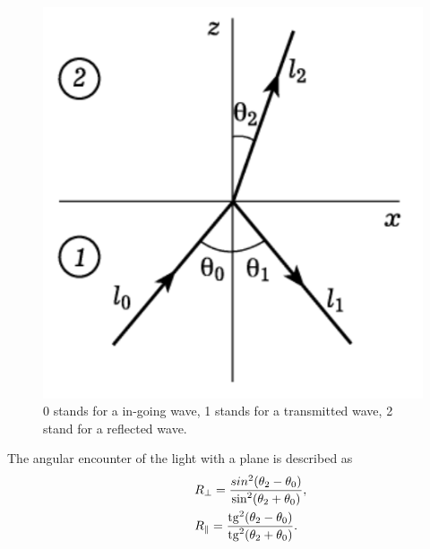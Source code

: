 \begin{minipage}{0.35\textwidth}
    \begin{figure}[h]
    \centering
    \includegraphics[width=1\textwidth]{images/brust.png}
    \caption{0 stands for a in-going wave, 1 stands for a transmitted wave, 2 stand for a reflected wave.}
\end{figure}
\end{minipage}
\hfill
\begin{minipage}{0.55\textwidth}
	The angular encounter of the light with a plane is described as
	\begin{equation}
		\begin{aligned}
			&R_\perp = \frac{sin^2(\theta_2 - \theta_0)}{\sin^2(\theta_2 + \theta_0)},\\
			\hspace{1 cm}
			&R_\parallel = \frac{\mathop{\mathrm{tg}}\nolimits^2(\theta_2 - \theta_0)}{\mathop{\mathrm{tg}}\nolimits^2(\theta_2 + \theta_0)}.	
		\end{aligned}
	\end{equation}    
\end{minipage}

